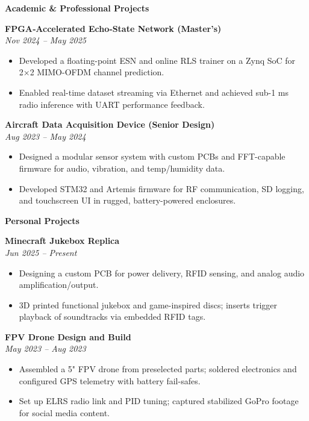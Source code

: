 \documentclass[9pt, letterpaper]{extarticle}
\newenvironment{highlights}{
    \begin{itemize}[
        topsep=0 pt,
        parsep=0 pt, 
        partopsep=0pt,
        itemsep=0pt,
        leftmargin=0.25 cm + 10pt
    ]
}{
    \end{itemize}
} %
\begin{document}
\begin{minipage}[t]{0.48\textwidth}
\textbf{\large Academic \& Professional Projects}

\vspace{4pt}

\textbf{FPGA‑Accelerated Echo‑State Network (Master’s)} \\
\textit{Nov 2024 -- May 2025} 
\begin{highlights}
    \item Developed a floating-point ESN and online RLS trainer on a Zynq SoC for 2×2 MIMO-OFDM channel prediction.
    \item Enabled real-time dataset streaming via Ethernet and achieved sub-1 ms radio inference with UART performance feedback.
\end{highlights}

\vspace{6pt}

\textbf{Aircraft Data Acquisition Device (Senior Design)} \\
\textit{Aug 2023 -- May 2024}
\begin{highlights}
    \item Designed a modular sensor system with custom PCBs and FFT-capable firmware for audio, vibration, and temp/humidity data.
    \item Developed STM32 and Artemis firmware for RF communication, SD logging, and touchscreen UI in rugged, battery-powered enclosures.
\end{highlights}


\end{minipage}
\hfill
\begin{minipage}[t]{0.48\textwidth}
\textbf{\large Personal Projects}

\vspace{4pt}

\textbf{Minecraft Jukebox Replica} \\
\textit{Jun 2025 -- Present}
\begin{highlights}
    \item Designing a custom PCB for power delivery, RFID sensing, and analog audio amplification/output.
    \item 3D printed functional jukebox and game-inspired discs; inserts trigger playback of soundtracks via embedded RFID tags.
\end{highlights}

\vspace{6pt}

\textbf{FPV Drone Design and Build} \\
\textit{May 2023 -- Aug 2023}
\begin{highlights}
    \item Assembled a 5" FPV drone from preselected parts; soldered electronics and configured GPS telemetry with battery fail-safes.
    \item Set up ELRS radio link and PID tuning; captured stabilized GoPro footage for social media content.
\end{highlights}
\end{minipage}
\end{document}
